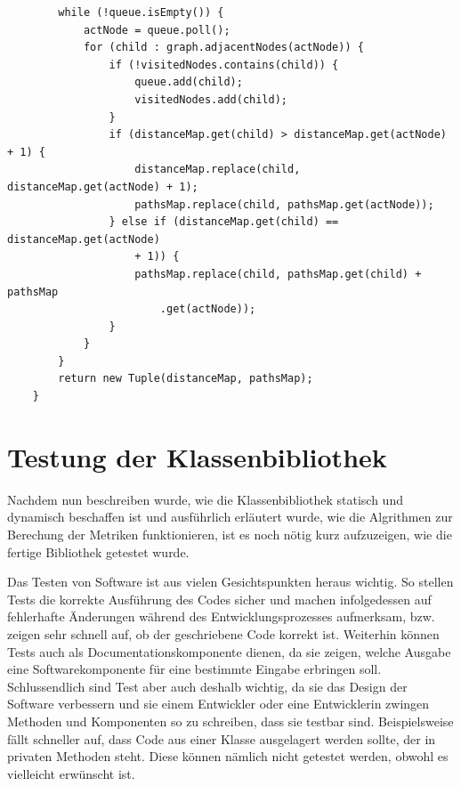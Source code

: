 \documentclass[a4paper,12pt,ngerman,chapterprefix=false,listof=totoc,bibliography=totoc]{scrreprt}
\begin{document}
{{{\begin{lstlisting}
		while (!queue.isEmpty()) {
			actNode = queue.poll();
			for (child : graph.adjacentNodes(actNode)) {
				if (!visitedNodes.contains(child)) {
					queue.add(child);
					visitedNodes.add(child);
				}
				if (distanceMap.get(child) > distanceMap.get(actNode) + 1) {
					distanceMap.replace(child, distanceMap.get(actNode) + 1);
					pathsMap.replace(child, pathsMap.get(actNode));
				} else if (distanceMap.get(child) == distanceMap.get(actNode) 
					+ 1)) {
					pathsMap.replace(child, pathsMap.get(child) + pathsMap
						.get(actNode));
				}
			}
		}
		return new Tuple(distanceMap, pathsMap);
	}
\end{lstlisting}
}
\section{Testung der Klassenbibliothek}
{
Nachdem nun beschreiben wurde, wie die Klassenbibliothek statisch und dynamisch beschaffen ist und ausführlich erläutert wurde, wie die Algrithmen zur Berechung der Metriken funktionieren, ist es noch nötig kurz aufzuzeigen, wie die fertige Bibliothek getestet wurde.

Das Testen von Software ist aus vielen Gesichtspunkten heraus wichtig. So stellen Tests die korrekte Ausführung des Codes sicher und machen infolgedessen auf fehlerhafte Änderungen während des Entwicklungsprozesses aufmerksam, bzw. zeigen sehr schnell auf, ob der geschriebene Code korrekt ist. Weiterhin können Tests auch als Documentationskomponente dienen, da sie zeigen, welche Ausgabe eine Softwarekomponente für eine bestimmte Eingabe erbringen soll. Schlussendlich sind Test aber auch deshalb wichtig, da sie das Design der Software verbessern und sie einem Entwickler oder eine Entwicklerin zwingen Methoden und Komponenten so zu schreiben, dass sie testbar sind. Beispielsweise fällt schneller auf, dass Code aus einer Klasse ausgelagert werden sollte, der in privaten Methoden steht. Diese können nämlich nicht getestet werden, obwohl es vielleicht erwünscht ist. \cite{gulati_java_2017}

}}}
\end{document}
